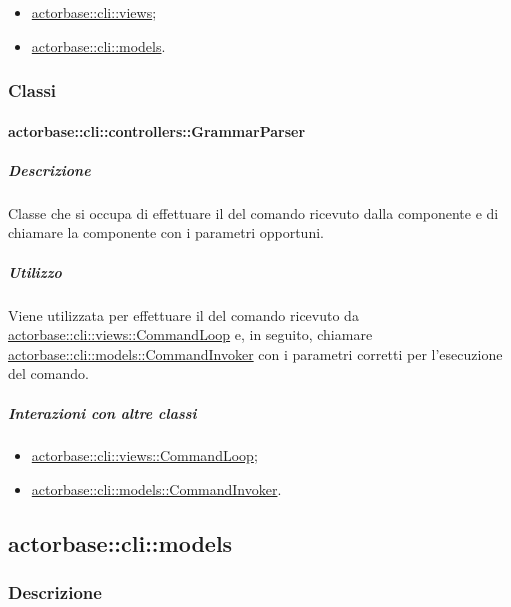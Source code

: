 \documentclass{scalatekids-article}
\begin{document}
\begin{itemize}
\item \hyperref[sec:actorbase::cli::views]{actorbase::cli::views};
\item \hyperref[sec:actorbase::cli::models]{actorbase::cli::models}.
\end{itemize}

\subsubsection{Classi}

\paragraph{actorbase::cli::controllers::GrammarParser}
\label{sec:actorbase::cli::controllers::GrammarParser}

\subparagraph{Descrizione}

Classe che si occupa di effettuare il  del comando ricevuto
dalla componente  e di chiamare la componente  con i
parametri opportuni.

\subparagraph{Utilizzo}

Viene utilizzata per effettuare il  del comando ricevuto da
\hyperref[sec:actorbase::cli::views::CommandLoop]{actorbase::cli::views::CommandLoop} e, in seguito, chiamare
\hyperref[sec:actorbase::cli::models::CommandInvoker]{actorbase::cli::models::CommandInvoker} con i parametri corretti per
l'esecuzione del comando.

\subparagraph{Interazioni con altre classi}

\begin{itemize}
\item \hyperref[sec:actorbase::cli::views::CommandLoop]{actorbase::cli::views::CommandLoop};
\item \hyperref[sec:actorbase::cli::models::CommandInvoker]{actorbase::cli::models::CommandInvoker}.
\end{itemize}

\subsection{actorbase::cli::models}
\label{sec:actorbase::cli::models}

\subsubsection{Descrizione}
\end{document}
